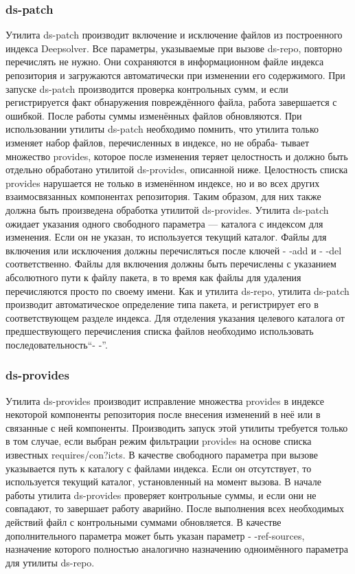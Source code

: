 \subsubsection{ds-patch}
Утилита ds-patch производит включение и исключение файлов из построенного
индекса Deepsolver. Все параметры, указываемые при вызове ds-repo,
повторно перечислять не нужно. Они сохраняются в информационном файле
индекса репозитория и загружаются автоматически при изменении его содержимого.
При запуске ds-patch производится проверка контрольных сумм, и
если регистрируется факт обнаружения повреждённого файла, работа завершается
с ошибкой. После работы суммы изменённых файлов обновляются.
При использовании утилиты ds-patch необходимо помнить, что утилита
только изменяет набор файлов, перечисленных в индексе, но не обраба-
тывает множество provides, которое после изменения теряет целостность и
должно быть отдельно обработано утилитой ds-provides, описанной ниже. 
Целостность списка provides нарушается не только в изменённом индексе, но и
во всех других взаимосвязанных компонентах репозитория. Таким образом,
для них также должна быть произведена обработка утилитой ds-provides.
Утилита ds-patch ожидает указания одного свободного параметра — каталога
с индексом для изменения. Если он не указан, то используется текущий
каталог. Файлы для включения или исключения должны перечисляться после ключей
- -add и - -del соответственно. Файлы для включения должны быть перечислены 
с указанием абсолютного пути к файлу пакета, в то время как файлы для удаления 
перечисляются просто по своему имени. Как и утилита ds-repo, утилита ds-patch
производит автоматическое определение типа пакета, и регистрирует его в
соответствующем разделе индекса. Для отделения указания целевого каталога 
от предшествующего перечисления списка файлов необходимо использовать
последовательность“- -”.

\subsubsection{ds-provides}
Утилита ds-provides производит исправление множества provides в индексе
некоторой компоненты репозитория после внесения изменений в неё или
в связанные с ней компоненты. Производить запуск этой утилиты требуется
только в том случае, если выбран режим фильтрации provides на основе
списка известных requires/con?icts. В качестве свободного параметра при 
вызове указывается путь к каталогу с файлами индекса. Если он отсутствует,
то используется текущий каталог, установленный на момент вызова. В начале
работы утилита ds-provides проверяет контрольные суммы, и если они
не совпадают, то завершает работу аварийно. После выполнения всех 
необходимых действий файл с контрольными суммами обновляется. В качестве
дополнительного параметра может быть указан параметр - -ref-sources,
назначение которого полностью аналогично назначению одноимённого параметра
для утилиты ds-repo.



